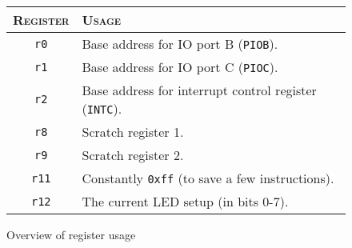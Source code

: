 \begin{figure}
\centering
\begin{tabular}{ c | l }
    \hline \hline
    \textsc{Register} & \textsc{Usage} \\ \hline
    \texttt{r0} &       Base address for IO port B (\texttt{PIOB}). \\
    \texttt{r1} &       Base address for IO port C (\texttt{PIOC}). \\
    \texttt{r2} &       Base address for interrupt control register
                        (\texttt{INTC}). \\
    \texttt{r8} &       Scratch register 1. \\
    \texttt{r9} &       Scratch register 2. \\
    \texttt{r11} &      Constantly \texttt{0xff} (to save a few
                        instructions). \\
    \texttt{r12} &      The current LED setup (in bits 0-7). \\
    \hline
\end{tabular}
\caption{Overview of register usage}
\label{tab:Registers}
\end{figure}
